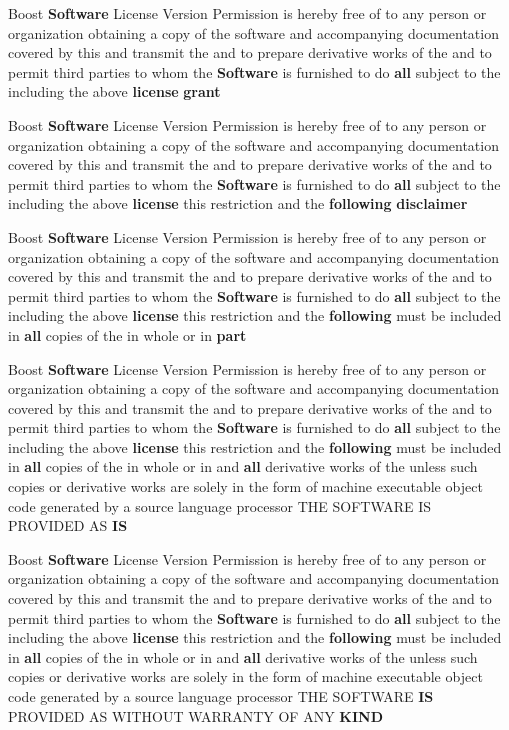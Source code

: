 \begin{DoxyCompactItemize}
Boost {\bf Software} License Version Permission is hereby free of to any person or organization obtaining a copy of the software and accompanying documentation covered by this and transmit the and to prepare derivative works of the and to permit third parties to whom the {\bf Software} is furnished to do {\bf all} subject to the including the above {\bf license} {\bf grant}
\item 
Boost {\bf Software} License Version Permission is hereby free of to any person or organization obtaining a copy of the software and accompanying documentation covered by this and transmit the and to prepare derivative works of the and to permit third parties to whom the {\bf Software} is furnished to do {\bf all} subject to the including the above {\bf license} this restriction and the {\bf following} {\bf disclaimer}
\item 
Boost {\bf Software} License Version Permission is hereby free of to any person or organization obtaining a copy of the software and accompanying documentation covered by this and transmit the and to prepare derivative works of the and to permit third parties to whom the {\bf Software} is furnished to do {\bf all} subject to the including the above {\bf license} this restriction and the {\bf following} must be included in {\bf all} copies of the in whole or in {\bf part}
\item 
Boost {\bf Software} License Version Permission is hereby free of to any person or organization obtaining a copy of the software and accompanying documentation covered by this and transmit the and to prepare derivative works of the and to permit third parties to whom the {\bf Software} is furnished to do {\bf all} subject to the including the above {\bf license} this restriction and the {\bf following} must be included in {\bf all} copies of the in whole or in and {\bf all} derivative works of the unless such copies or derivative works are solely in the form of machine executable object code generated by a source language processor T\+HE S\+O\+F\+T\+W\+A\+RE IS P\+R\+O\+V\+I\+D\+ED AS {\bf IS}
\item 
Boost {\bf Software} License Version Permission is hereby free of to any person or organization obtaining a copy of the software and accompanying documentation covered by this and transmit the and to prepare derivative works of the and to permit third parties to whom the {\bf Software} is furnished to do {\bf all} subject to the including the above {\bf license} this restriction and the {\bf following} must be included in {\bf all} copies of the in whole or in and {\bf all} derivative works of the unless such copies or derivative works are solely in the form of machine executable object code generated by a source language processor T\+HE S\+O\+F\+T\+W\+A\+RE {\bf IS} P\+R\+O\+V\+I\+D\+ED AS W\+I\+T\+H\+O\+UT W\+A\+R\+R\+A\+N\+TY OF A\+NY {\bf K\+I\+ND}

\end{DoxyCompactItemize}
